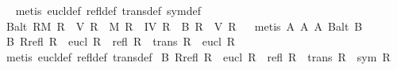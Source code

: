 \begin{isabellebody}
%
\isadelimproof
\ %
\endisadelimproof
%
\isatagproof
{}\isamarkupfalse%
\ {\isacharparenleft}metis\ eucl{\isacharunderscore}def\ refl{\isacharunderscore}def\ trans{\isacharunderscore}def\ sym{\isacharunderscore}def{\isacharparenright}%
\endisatagproof
{\isafoldproof}%
%
\isadelimproof
\isanewline
%
\endisadelimproof
{}\isamarkupfalse%
\ B{}{\isacharunderscore}alt{\isacharcolon}\ {\isachardoublequoteopen}{\isasymforall}R{\isachardot}{\isacharparenleft}{\isacharparenleft}M\ R{\isacharparenright}\ {\isasymand}\ {\isacharparenleft}V\ R{\isacharparenright}{\isacharparenright}\ {\isasymlongleftrightarrow}\ {\isacharparenleft}{\isacharparenleft}M\ R{\isacharparenright}\ {\isasymand}\ {\isacharparenleft}IV\ R{\isacharparenright}\ {\isasymand}\ {\isacharparenleft}B\ R{\isacharparenright}\ {\isasymand}\ {\isacharparenleft}V\ R{\isacharparenright}{\isacharparenright}{\isachardoublequoteclose}\isanewline
%
\isadelimproof
\ %
\endisadelimproof
%
\isatagproof
{}\isamarkupfalse%
\ {\isacharparenleft}metis\ A{}\ A{}\ A{}\ B{}{\isacharunderscore}alt\ B{}{\isacharparenright}%
\endisatagproof
{\isafoldproof}%
%
\isadelimproof
%
\endisadelimproof
%
\isamarkuptrue%
\isamarkupfalse%
\ B{}{\isacharcolon}\ {\isachardoublequoteopen}{\isasymforall}R{\isachardot}{\isacharparenleft}{\isacharparenleft}refl\ R{\isacharparenright}\ {\isasymand}\ {\isacharparenleft}eucl\ R{\isacharparenright}{\isacharparenright}\ {\isasymlongleftrightarrow}\ {\isacharparenleft}{\isacharparenleft}refl\ R{\isacharparenright}\ {\isasymand}\ {\isacharparenleft}trans\ R{\isacharparenright}\ {\isasymand}\ {\isacharparenleft}eucl\ R{\isacharparenright}{\isacharparenright}{\isachardoublequoteclose}\ \isanewline
%
\isadelimproof
\ %
\endisadelimproof
%
\isatagproof
{}\isamarkupfalse%
\ {\isacharparenleft}metis\ eucl{\isacharunderscore}def\ refl{\isacharunderscore}def\ trans{\isacharunderscore}def{\isacharparenright}%
\endisatagproof
{\isafoldproof}%
%
\isadelimproof
%
\endisadelimproof
%
\isamarkuptrue%
\isamarkupfalse%
\ B{}{\isacharcolon}\ {\isachardoublequoteopen}{\isasymforall}R{\isachardot}{\isacharparenleft}{\isacharparenleft}refl\ R{\isacharparenright}\ {\isasymand}\ {\isacharparenleft}eucl\ R{\isacharparenright}{\isacharparenright}\ {\isasymlongleftrightarrow}\ {\isacharparenleft}{\isacharparenleft}refl\ R{\isacharparenright}\ {\isasymand}\ {\isacharparenleft}trans\ R{\isacharparenright}\ {\isasymand}\ {\isacharparenleft}sym\ R{\isacharparenright}{\isacharparenright}{\isachardoublequoteclose}\isanewline

\end{isabellebody}
